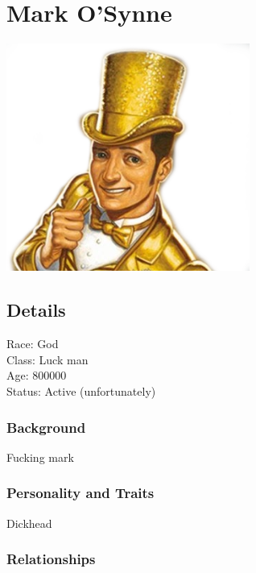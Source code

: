 \section{Mark O'Synne}

\begin{center}
\includegraphics[width=80mm]{./content/img/mark.png}
\begin{figure}[h]
\end{figure}
\end{center}

\subsection*{Details} 

\noindent

Race: 	God \\
Class: 	Luck man \\
Age: 	800000 \\
Status: Active  (unfortunately)

\subsubsection{Background}

Fucking mark

\subsubsection{Personality and Traits}

Dickhead

\subsubsection{Relationships}



